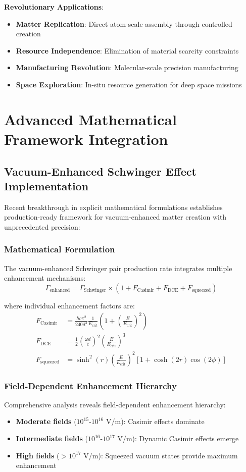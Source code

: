 \documentclass[11pt]{article}
\begin{document}
\textbf{Revolutionary Applications}:
\begin{itemize}
\item \textbf{Matter Replication}: Direct atom-scale assembly through controlled creation
\item \textbf{Resource Independence}: Elimination of material scarcity constraints
\item \textbf{Manufacturing Revolution}: Molecular-scale precision manufacturing
\item \textbf{Space Exploration}: In-situ resource generation for deep space missions
\end{itemize}

\section{Advanced Mathematical Framework Integration}

\subsection{Vacuum-Enhanced Schwinger Effect Implementation}
Recent breakthrough in explicit mathematical formulations establishes production-ready framework for vacuum-enhanced matter creation with unprecedented precision:

\subsubsection{Mathematical Formulation}
The vacuum-enhanced Schwinger pair production rate integrates multiple enhancement mechanisms:
\begin{equation}
\Gamma_{\text{enhanced}} = \Gamma_{\text{Schwinger}} \times (1 + F_{\text{Casimir}} + F_{\text{DCE}} + F_{\text{squeezed}})
\end{equation}

where individual enhancement factors are:
\begin{align}
F_{\text{Casimir}} &= \frac{\hbar c \pi^2}{240 d^4} \frac{1}{E_{\text{crit}}} \left(1 + \left(\frac{E}{E_{\text{crit}}}\right)^2\right) \\
F_{\text{DCE}} &= \frac{1}{2} \left(\frac{\omega d}{c}\right)^2 \left(\frac{E}{E_{\text{crit}}}\right)^3 \\
F_{\text{squeezed}} &= \sinh^2(r) \left(\frac{E}{E_{\text{crit}}}\right)^2 [1 + \cosh(2r)\cos(2\phi)]
\end{align}

\subsubsection{Field-Dependent Enhancement Hierarchy}
Comprehensive analysis reveals field-dependent enhancement hierarchy:
\begin{itemize}
\item \textbf{Moderate fields} ($10^{15}$-$10^{16}$ V/m): Casimir effects dominate
\item \textbf{Intermediate fields} ($10^{16}$-$10^{17}$ V/m): Dynamic Casimir effects emerge  
\item \textbf{High fields} ($>10^{17}$ V/m): Squeezed vacuum states provide maximum enhancement
\end{itemize}
\end{document}
